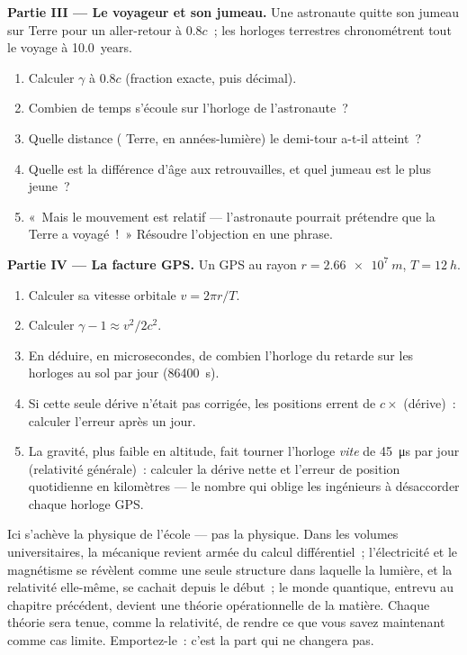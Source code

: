 \begin{problem}
\medskip
\noindent\textbf{Partie III --- Le voyageur et son jumeau.}
Une astronaute quitte son jumeau sur Terre pour un aller-retour à
$0.8c$~; les horloges terrestres chronométrent tout le voyage à
\qty{10.0}{years}.
\begin{enumerate}[resume]
  \item Calculer $\gamma$ à $0.8c$ (fraction exacte, puis décimal).
  \item Combien de temps s'écoule sur l'horloge de l'astronaute~?
  \item Quelle distance ( Terre, en
        années-lumière) le demi-tour a-t-il
        atteint~?
  \item Quelle est la différence d'âge aux retrouvailles, et quel
        jumeau est le plus jeune~?
  \item «~Mais le mouvement est relatif --- l'astronaute pourrait
        prétendre que la Terre a voyagé~!~» Résoudre l'objection en
        une phrase.
\end{enumerate}

\medskip
\noindent\textbf{Partie IV --- La facture GPS.}
Un  GPS
 au rayon $r = \qty{2.66e7}{m}$,
 $T = \qty{12}{h}$.
\begin{enumerate}[resume]
  \item Calculer sa vitesse orbitale $v = 2\pi r/T$.
  \item Calculer $\gamma - 1 \approx v^2/2c^2$.
  \item En déduire, en microsecondes, de combien l'horloge du
         retarde sur les horloges
        au sol par jour (\qty{86400}{s}).
  \item Si cette seule dérive n'était pas corrigée, les positions
        errent de $c \times$ (dérive)~: calculer l'erreur après un
        jour.
  \item La gravité, plus faible en altitude, fait tourner l'horloge
        \emph{vite} de \qty{45}{\micro s} par jour (relativité
        générale)~: calculer la dérive nette et l'erreur de position
        quotidienne en kilomètres --- le nombre qui oblige les
        ingénieurs à désaccorder chaque horloge GPS.
\end{enumerate}
\end{problem}

\bigskip
\noindent
Ici s'achève la physique de l'école --- pas la physique. Dans les
volumes universitaires, la mécanique revient armée du calcul
différentiel~; l'électricité et le magnétisme se révèlent comme une
seule structure dans laquelle la lumière, et la relativité
elle-même, se cachait depuis le début~; le monde quantique, entrevu
au chapitre précédent, devient une théorie opérationnelle de la
matière. Chaque théorie sera tenue, comme la relativité, de rendre
ce que vous savez maintenant comme cas limite. Emportez-le~: c'est
la part qui ne changera pas.

